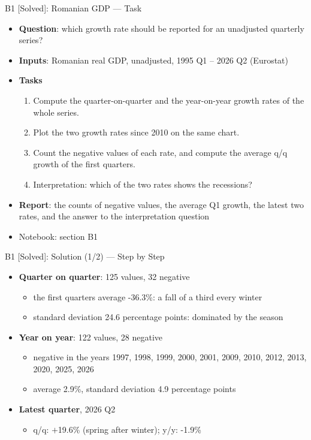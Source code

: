 \begin{frame}{B1 [Solved]: Romanian GDP --- Task}
\itemsize{\footnotesize}
\begin{itemize}
\item \textbf{Question}: which growth rate should be reported for an unadjusted quarterly series?
\item \textbf{Inputs}: Romanian real GDP, unadjusted, 1995 Q1 -- 2026 Q2 (Eurostat)
\item \textbf{Tasks}
\begin{enumerate}
    \item Compute the quarter-on-quarter and the year-on-year growth rates of the whole series.
    \item Plot the two growth rates since 2010 on the same chart.
    \item Count the negative values of each rate, and compute the average q/q growth of the first quarters.
    \item Interpretation: which of the two rates shows the recessions?
\end{enumerate}
\item \textbf{Report}: the counts of negative values, the average Q1 growth, the latest two rates, and the answer to the interpretation question
\item Notebook: section B1
\end{itemize}
\end{frame}

\begin{frame}{B1 [Solved]: Solution (1/2) --- Step by Step}
\itemsize{\footnotesize}
\begin{itemize}
    \item \textbf{Quarter on quarter}: 125 values, 32 negative
    \begin{itemize}
        \item the first quarters average -36.3\%: a fall of a third every winter
        \item standard deviation 24.6 percentage points: dominated by the season
    \end{itemize}
    \item \textbf{Year on year}: 122 values, 28 negative
    \begin{itemize}
        \item negative in the years 1997, 1998, 1999, 2000, 2001, 2009, 2010, 2012, 2013, 2020, 2025, 2026
        \item average 2.9\%, standard deviation 4.9 percentage points
    \end{itemize}
    \item \textbf{Latest quarter}, 2026 Q2
    \begin{itemize}
        \item q/q: $+$19.6\% (spring after winter); y/y: -1.9\%
    \end{itemize}
\end{itemize}
\end{frame}

